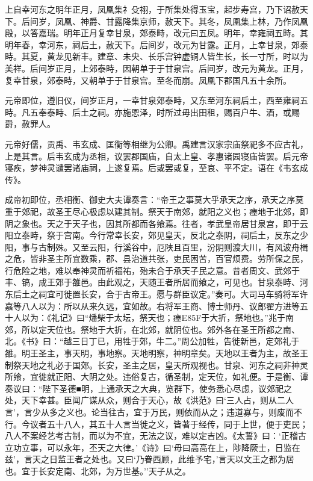 \documentclass[]{article}
\begin{document}
上自幸河东之明年正月，凤凰集礻殳祤，于所集处得玉宝，起步寿宫，乃下诏赦天下。后间岁，凤凰、神爵、甘露降集京师，赦天下。其冬，凤凰集上林，乃作凤凰殿，以答嘉瑞。明年正月复幸甘泉，郊泰畤，改元曰五凤。明年，幸雍祠五畤。其明年春，幸河东，祠后土，赦天下。后间岁，改元为甘露。正月，上幸甘泉，郊泰畤。其夏，黄龙见新丰。建章、未央、长乐宫钟虚铜人皆生长，长一寸所，时以为美祥。后间岁正月，上郊泰畤，因朝单于于甘泉宫。后间岁，改元为黄龙。正月，复幸甘泉，郊泰畤，又朝单于于甘泉宫。至冬而崩。凤凰下郡国凡五十余所。

元帝即位，遵旧仪，间岁正月，一幸甘泉郊泰畤，又东至河东祠后土，西至雍祠五畤。凡五奉泰畤、后土之祠。亦施恩泽，时所过毋出田租，赐百户牛、酒，或赐爵，赦罪人。

元帝好儒，贡禹、韦玄成、匡衡等相继为公卿。禹建言汉家宗庙祭祀多不应古礼，上是其言。后韦玄成为丞相，议罢郡国庙，自太上皇、孝惠诸园寝庙皆罢。后元帝寝疾，梦神灵谴罢诸庙祠，上遂复焉。后或罢或复，至哀、平不定。语在《韦玄成传》。

成帝初即位，丞相衡、御史大夫谭奏言：``帝王之事莫大乎承天之序，承天之序莫重于郊祀，故圣王尽心极虑以建其制。祭天于南郊，就阳之义也；瘗地于北郊，即阴之象也。天之于天子也，因其所都而各飨焉。往者，孝武皇帝居甘泉宫，即于云阳立泰畤，祭于宫南。今行常幸长安，郊见皇天，反北之泰阴，祠后土，反东之少阳，事与古制殊。又至云阳，行溪谷中，厄陕且百里，汾阴则渡大川，有风波舟楫之危，皆非圣主所宜数乘，郡、县治道共张，吏民困苦，百官烦费。劳所保之民，行危险之地，难以奉神灵而祈福祐，殆未合于承天子民之意。昔者周文、武郊于丰、镐，成王郊于雒邑。由此观之，天随王者所居而飨之，可见也。甘泉泰畤、河东后土之祠宜可徙置长安，合于古帝王。愿与群臣议定。''奏可。大司马车骑将军许嘉等八人以为：所以从来久远，宜如故。右将军王商、博士师丹、议郎翟方进等五十人以为：《礼记》曰``燔柴于太坛，祭天也；瘗E85F于大折，祭地也。''兆于南郊，所以定天位也。祭地于大折，在北郊，就阴位也。郊外各在圣王所都之南、北。《书》曰：``越三日丁已，用牲于郊，牛二。''周公加牲，告徙新邑，定郊礼于雒。明王圣主，事天明，事地察。天地明察，神明章矣。天地以王者为主，故圣王制祭天地之礼必于国郊。长安，圣主之居，皇天所观视也。甘泉、河东之祠非神灵所飨，宜徙就正阳、大阴之处。违俗复古，循圣制，定天位，如礼便。于是衡、谭奏议曰：``陛下圣德■明，上通承天之大典，览群下，使务悉心尽虑，议郊祀之处，天下幸甚。臣闻广谋从众，则合于天心，故《洪范》曰`三人占，则从二人言'，言少从多之义也。论当往古，宜于万民，则依而从之；违道寡与，则废而不行。今议者五十八人，其五十人言当徙之义，皆著于经传，同于上世，便于吏民；八人不案经艺考古制，而以为不宜，无法之议，难以定吉凶。《太誓》曰：`正稽古立功立事，可以永年，丕天之大律。'《诗》曰`毋曰高高在上，陟降厥士，日监在兹'，言天之日监王者之处也。又曰`乃眷西顾，此维予宅，'言天以文王之都为居也。宜于长安定南、北郊，为万世基。''天子从之。
\end{document}
